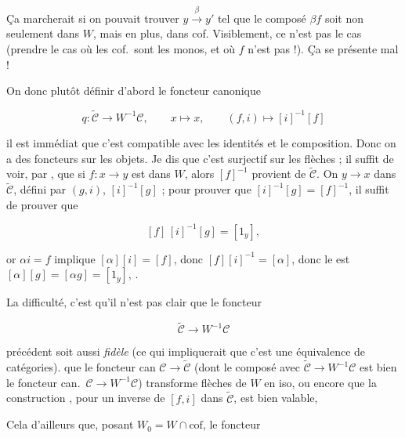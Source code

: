 \documentclass[11pt,a4paper]{article}
\begin{document}
Ça marcherait si on pouvait trouver $y \overset{\beta}{\longrightarrow} y'$
 tel que le composé $\beta f$ soit non seulement dans $W$, mais
en plus, dans cof. Visiblement, ce n'est pas  le cas (prendre le
cas où les cof.\ sont les monos, et où $f$ n'est pas  !).
Ça se présente mal !

On  donc plutôt  définir d'abord le foncteur canonique

\[
q : \widetilde{\mathcal{C}} \longrightarrow W^{-1}\mathcal{C},
\qquad x \longmapsto x,
\qquad (f,i) \longmapsto [i]^{-1}[f]
\]

il est immédiat que c'est compatible avec les identités et le composition.
Donc on a  des foncteurs   sur les
objets. Je dis que c'est surjectif sur les flèches ; il suffit de voir,
par , que si $f : x \to y$ est dans $W$, alors
$[f]^{-1}$ provient de $\widetilde{\mathcal{C}}$. On 
 $y \to x$ dans $\widetilde{\mathcal{C}}$, défini par
$(g,i)$,  
$[i]^{-1}[g]$ ; pour prouver que $[i]^{-1}[g] = [f]^{-1}$, il suffit de
prouver que

\[
[f]\,[i]^{-1}[g] = [1_y],
\]

or $\alpha i = f$ implique $[\alpha][i] = [f]$, donc $[f][i]^{-1} = [\alpha]$,
donc le  est $[\alpha][g] = [\alpha g] = [1_y]$,
.


La difficulté, c'est qu'il n'est pas clair que le foncteur

\[
\widetilde{\mathcal{C}} \longrightarrow W^{-1}\mathcal{C}
\]

précédent soit aussi \emph{fidèle}  (ce qui
impliquerait que c'est une équivalence de catégories).
que le foncteur can $\mathcal{C} \longrightarrow
\widetilde{\mathcal{C}}$ (dont le composé avec
$\widetilde{\mathcal{C}} \to W^{-1}\mathcal{C}$ est bien le foncteur can.\
$\mathcal{C} \to W^{-1}\mathcal{C}$)
transforme flèches de $W$ en iso, ou encore que la
construction \ill{} , pour 
 un inverse de $[f, i]$ dans $\widetilde{\mathcal{C}}$, est bien
valable, \struck{i.e.}

Cela  d'ailleurs  que, 
posant $W_0 = W \cap \mathrm{cof}$, le foncteur
\end{document}
